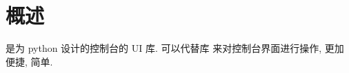 \section{\urwid{} 概述}
\indent\urwid{} 是为 python 设计的控制台的 UI 库. \urwid{} 可以代替库  来对控制台界面进行操作, 更加便捷, 简单.
